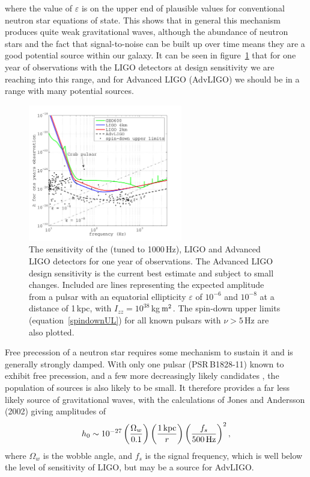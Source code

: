 where the value of $\varepsilon$ is on the upper end of plausible values for conventional neutron
star equations of state. This shows that in general this mechanism produces quite weak
gravitational waves, although the abundance of neutron stars and the fact that signal-to-noise can
be built up over time means they are a good potential source within our galaxy. It can be seen in
figure~\ref{designcurves1year} that for one year of observations with the LIGO detectors at design
sensitivity we are reaching into this range, and for Advanced LIGO (AdvLIGO) we should be in a range
with many potential sources.
\begin{figure}[!htbp]
\begin{center}
\includegraphics[width=0.6\textwidth]{figs/designcurves1year}\caption[The sensitivity
of the G\textsc{eo}\,600, LIGO and Advanced LIGO detectors for one year of observations.]{The
sensitivity of the \geo (tuned to 1000\,Hz), LIGO and Advanced LIGO detectors for one year of
observations. The Advanced LIGO design sensitivity is the current best estimate and subject to small
changes. Included are lines representing the expected \gw amplitude from a pulsar with an equatorial
ellipticity $\varepsilon$ of $10^{-6}$ and $10^{-8}$ at a distance of 1\,kpc, with $I_{zz} =
10^{38}$\,kg\,${\rm m}^2$. The spin-down upper limits (equation~\ref{spindownUL}) for all known
pulsars with $\nu > 5$\,Hz are also plotted.}\label{designcurves1year}
\end{center}
\end{figure}

Free precession of a neutron star requires some mechanism to sustain it and is generally strongly
damped. With only one pulsar (PSR\,B1828-11) known to exhibit free precession, and a few more
decreasingly likely candidates \cite{Culter:2003}, the population of sources is also likely
to be small. It therefore provides a far less likely source of gravitational waves, with the
calculations of Jones and Andersson (2002) \cite{JonesAndersson:2002} giving amplitudes of
\begin{equation}
h_0 \sim 10^{-27}\left(\frac{\Omega_w}{0.1}\right)\left(\frac{1\,{\rm 
kpc}}{r}\right)\left(\frac{f_s}{500\,{\rm Hz}}\right)^2,
\end{equation}
where $\Omega_w$ is the wobble angle, and $f_s$ is the signal frequency, which is well below the 
level of sensitivity of LIGO, but may be a source for AdvLIGO.

